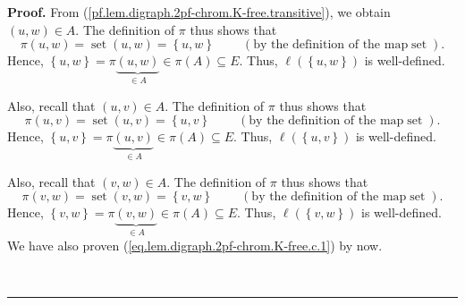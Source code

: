 \documentclass[numbers=enddot,12pt,final,onecolumn,notitlepage]{scrartcl}%
\theoremstyle{definition}
\newenvironment{proof}[1][Proof]{\noindent\textbf{#1.} }{\ \rule{0.5em}{0.5em}}
\newenvironment{verlong}{}{}
\begin{document}
\begin{verlong}
\begin{proof}
From (\ref{pf.lem.digraph.2pf-chrom.K-free.transitive}), we obtain $\left(
u,w\right)  \in A$. The definition of $\pi$ thus shows that%
\[
\pi\left(  u,w\right)  =\operatorname*{set}\left(  u,w\right)  =\left\{
u,w\right\}  \ \ \ \ \ \ \ \ \ \ \left(  \text{by the definition of the map
}\operatorname*{set}\right)  .
\]
Hence, $\left\{  u,w\right\}  =\pi\underbrace{\left(  u,w\right)  }_{\in A}%
\in\pi\left(  A\right)  \subseteq E$. Thus, $\ell\left(  \left\{  u,w\right\}
\right)  $ is well-defined.

Also, recall that $\left(  u,v\right)  \in A$. The definition of $\pi$ thus
shows that%
\[
\pi\left(  u,v\right)  =\operatorname*{set}\left(  u,v\right)  =\left\{
u,v\right\}  \ \ \ \ \ \ \ \ \ \ \left(  \text{by the definition of the map
}\operatorname*{set}\right)  .
\]
Hence, $\left\{  u,v\right\}  =\pi\underbrace{\left(  u,v\right)  }_{\in A}%
\in\pi\left(  A\right)  \subseteq E$. Thus, $\ell\left(  \left\{  u,v\right\}
\right)  $ is well-defined.

Also, recall that $\left(  v,w\right)  \in A$. The definition of $\pi$ thus
shows that%
\[
\pi\left(  v,w\right)  =\operatorname*{set}\left(  v,w\right)  =\left\{
v,w\right\}  \ \ \ \ \ \ \ \ \ \ \left(  \text{by the definition of the map
}\operatorname*{set}\right)  .
\]
Hence, $\left\{  v,w\right\}  =\pi\underbrace{\left(  v,w\right)  }_{\in A}%
\in\pi\left(  A\right)  \subseteq E$. Thus, $\ell\left(  \left\{  v,w\right\}
\right)  $ is well-defined. We have also proven
(\ref{eq.lem.digraph.2pf-chrom.K-free.c.1}) by now.


\end{proof}
\end{verlong}
\end{document}
